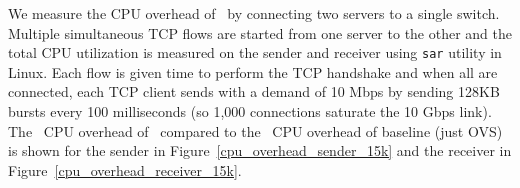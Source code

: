 %
%
%

We measure the CPU overhead of~\acdc{} by connecting two servers to a single switch. 
Multiple simultaneous TCP flows are started from one server to the other and the total CPU utilization
is measured on the sender and receiver using {\tt sar} utility in Linux. Each flow is given time to perform the TCP handshake
and when all are connected, each TCP client sends with a demand of 10 Mbps by sending 128KB bursts every 100 milliseconds (so 1,000 connections saturate the 10 Gbps link). 
The~ CPU overhead of~\acdc{} compared to the~ CPU overhead of baseline (\ie{}just OVS) 
is shown for the sender in Figure~\ref{cpu_overhead_sender_15k}
 and the receiver in Figure~\ref{cpu_overhead_receiver_15k}.~


